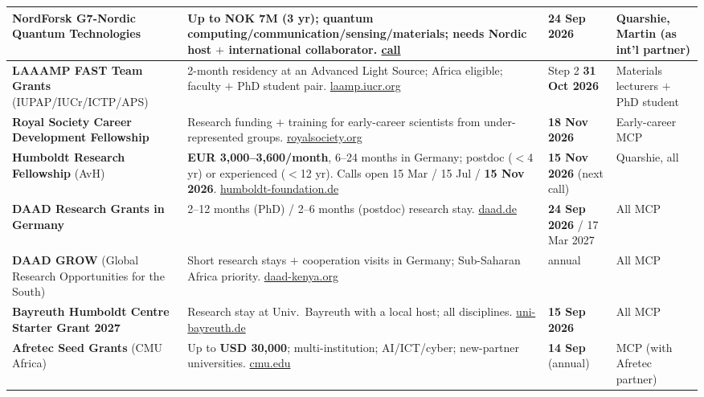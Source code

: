 \documentclass[11pt,a4paper]{article}
\begin{document}
\begin{longtable}{@{}p{3.3cm}p{5.6cm}p{2.2cm}p{2.8cm}@{}}
\midrule
\textbf{NordForsk G7-Nordic Quantum Technologies} & Up to \textbf{NOK 7M} (3 yr); quantum computing/communication/sensing/materials; needs Nordic host $+$ international collaborator. \href{https://www2.fundsforngos.org/science/applications-open-for-quantum-technologies-funding-program/}{call} & \textbf{24 Sep 2026} & Quarshie, Martin (as int'l partner) \\
\midrule
\textbf{LAAAMP FAST Team Grants} (IUPAP/IUCr/ICTP/APS) & 2-month residency at an Advanced Light Source; Africa eligible; faculty $+$ PhD student pair. \href{https://laamp.iucr.org/grants/calls/jan-dec-2027}{laamp.iucr.org} & Step 2 \textbf{31 Oct 2026} & Materials lecturers $+$ PhD student \\
\midrule
\textbf{Royal Society Career Development Fellowship} & Research funding $+$ training for early-career scientists from under-represented groups. \href{https://royalsociety.org/grants/career-development-fellowship/}{royalsociety.org} & \textbf{18 Nov 2026} & Early-career MCP \\
\midrule
\textbf{Humboldt Research Fellowship} (AvH) & \textbf{EUR 3{,}000--3{,}600/month}, 6--24 months in Germany; postdoc ($<$4 yr) or experienced ($<$12 yr). Calls open 15 Mar / 15 Jul / \textbf{15 Nov 2026}. \href{https://www.humboldt-foundation.de/en/apply/sponsorship-programmes/humboldt-research-fellowship}{humboldt-foundation.de} & \textbf{15 Nov 2026} (next call) & Quarshie, all \\
\midrule
\textbf{DAAD Research Grants in Germany} & 2--12 months (PhD) / 2--6 months (postdoc) research stay. \href{https://www2.daad.de/deutschland/stipendium/datenbank/en/21148-scholarship-database/?detail=57742121}{daad.de} & \textbf{24 Sep 2026} / 17 Mar 2027 & All MCP \\
\midrule
\textbf{DAAD GROW} (Global Research Opportunities for the South) & Short research stays $+$ cooperation visits in Germany; Sub-Saharan Africa priority. \href{https://www.daad-kenya.org/en/call-for-proposals-applications/}{daad-kenya.org} & annual & All MCP \\
\midrule
\textbf{Bayreuth Humboldt Centre Starter Grant 2027} & Research stay at Univ.\ Bayreuth with a local host; all disciplines. \href{https://www.humboldt-centre.uni-bayreuth.de/en/applications/index.php}{uni-bayreuth.de} & \textbf{15 Sep 2026} & All MCP \\
\midrule
\textbf{Afretec Seed Grants} (CMU Africa) & Up to \textbf{USD 30{,}000}; multi-institution; AI/ICT/cyber; new-partner universities. \href{https://engineering.cmu.edu/afretec/funding-opportunities/index.html}{cmu.edu} & \textbf{14 Sep} (annual) & MCP (with Afretec partner) \\

\end{longtable}
\end{document}

